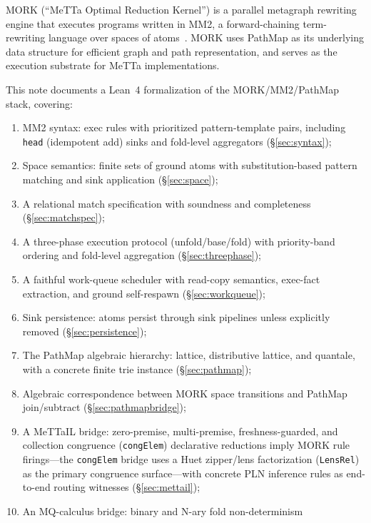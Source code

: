\documentclass[11pt]{article}
\theoremstyle{definition}
\theoremstyle{remark}
\newcommand{\MORK}{\textup{MORK}}
\newcommand{\MeTTa}{\textup{MeTTa}}
\newcommand{\MeTTaIL}{\textup{MeTTaIL}}
\newcommand{\PathMap}{\textup{PathMap}}
\begin{document}
\MORK{} (``\MeTTa{} Optimal Reduction Kernel'') is a parallel metagraph
rewriting engine that executes programs written in MM2, a forward-chaining
term-rewriting language over spaces of atoms~\cite{MeredithStayOSLF2020}.
\MORK{} uses \PathMap{} as its underlying data structure for efficient
graph and path representation, and serves as the execution substrate for
\MeTTa{} implementations.

This note documents a Lean~4 formalization of the \MORK{}/MM2/\PathMap{} stack,
covering:
\begin{enumerate}[nosep]
  \item MM2 syntax: exec rules with prioritized pattern-template pairs,
        including \texttt{head} (idempotent add) sinks and fold-level
        aggregators (\S\ref{sec:syntax});
  \item Space semantics: finite sets of ground atoms with substitution-based
        pattern matching and sink application (\S\ref{sec:space});
  \item A relational match specification with soundness and completeness
        (\S\ref{sec:matchspec});
  \item A three-phase execution protocol (unfold/base/fold) with
        priority-band ordering and fold-level aggregation
        (\S\ref{sec:threephase});
  \item A faithful work-queue scheduler with read-copy semantics, exec-fact
        extraction, and ground self-respawn (\S\ref{sec:workqueue});
  \item Sink persistence: atoms persist through sink pipelines unless
        explicitly removed (\S\ref{sec:persistence});
  \item The \PathMap{} algebraic hierarchy: lattice, distributive lattice,
        and quantale, with a concrete finite trie instance (\S\ref{sec:pathmap});
  \item Algebraic correspondence between \MORK{} space transitions and
        \PathMap{} join/subtract (\S\ref{sec:pathmapbridge});
  \item A \MeTTaIL{} bridge: zero-premise, multi-premise,
        freshness-guarded, and collection congruence (\texttt{congElem})
        declarative reductions imply \MORK{} rule firings---the
        \texttt{congElem} bridge uses a Huet zipper/lens factorization
        (\texttt{LensRel}) as the primary congruence surface---with
        concrete PLN inference rules as end-to-end
        routing witnesses (\S\ref{sec:mettail});
  \item An MQ-calculus bridge: binary and N-ary fold non-determinism

\end{enumerate}
\end{document}
